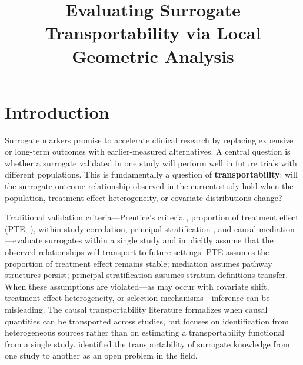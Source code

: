 \documentclass{article}
\title{Evaluating Surrogate Transportability via Local Geometric Analysis}
\begin{document}
\maketitle

\section{Introduction}

Surrogate markers promise to accelerate clinical research by replacing expensive or long-term outcomes with earlier-measured alternatives. A central question is whether a surrogate validated in one study will perform well in future trials with different populations. This is fundamentally a question of \textbf{transportability}: will the surrogate-outcome relationship observed in the current study hold when the population, treatment effect heterogeneity, or covariate distributions change?

Traditional validation criteria---Prentice's criteria \cite{prentice1989surrogate}, proportion of treatment effect (PTE; \cite{freedman1992statistical,chen2003pte}), within-study correlation, principal stratification \cite{frangakis2002principal}, and causal mediation \cite{vanderweele2015mediation}---evaluate surrogates within a single study and implicitly assume that the observed relationships will transport to future settings. PTE assumes the proportion of treatment effect remains stable; mediation assumes pathway structures persist; principal stratification assumes stratum definitions transfer. When these assumptions are violated---as may occur with covariate shift, treatment effect heterogeneity, or selection mechanisms---inference can be misleading. The causal transportability literature \citep{pearl2011transportability,bareinboim2016causal} formalizes when causal quantities can be transported across studies, but focuses on identification from heterogeneous sources rather than on estimating a transportability functional from a single study. \citet{parast2025tutorial} identified the transportability of surrogate knowledge from one study to another as an open problem in the field. %
\end{document}

